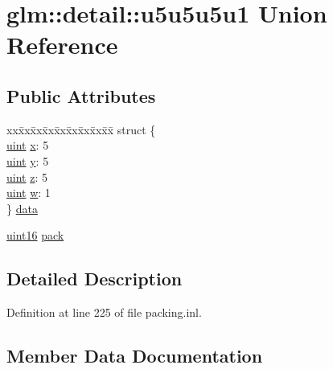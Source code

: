 \hypertarget{unionglm_1_1detail_1_1u5u5u5u1}{}\section{glm\+::detail\+::u5u5u5u1 Union Reference}
\label{unionglm_1_1detail_1_1u5u5u5u1}
\subsection*{Public Attributes}
\begin{DoxyCompactItemize}
\item 
\begin{tabbing}
xx\=xx\=xx\=xx\=xx\=xx\=xx\=xx\=xx\=\kill
struct \{\\
\>\mbox{\hyperlink{group__core__precision_ga4fd29415871152bfb5abd588334147c8}{uint}} \mbox{\hyperlink{unionglm_1_1detail_1_1u5u5u5u1_a2d802a46e48a88f87754882be376b34f}{x}}: 5\\
\>\mbox{\hyperlink{group__core__precision_ga4fd29415871152bfb5abd588334147c8}{uint}} \mbox{\hyperlink{unionglm_1_1detail_1_1u5u5u5u1_a8dff950581d19ad8a5137dbfffc63a64}{y}}: 5\\
\>\mbox{\hyperlink{group__core__precision_ga4fd29415871152bfb5abd588334147c8}{uint}} \mbox{\hyperlink{unionglm_1_1detail_1_1u5u5u5u1_a110d067e1f37f6137c2806102c4508f6}{z}}: 5\\
\>\mbox{\hyperlink{group__core__precision_ga4fd29415871152bfb5abd588334147c8}{uint}} \mbox{\hyperlink{unionglm_1_1detail_1_1u5u5u5u1_a1dc286ba6a4f8b0c04db3997af661cd5}{w}}: 1\\
\} \mbox{\hyperlink{unionglm_1_1detail_1_1u5u5u5u1_a900aa35cb1048e63ac8aebb5ca69d0a5}{data}}\\

\end{tabbing}\item 
\mbox{\hyperlink{namespaceglm_1_1detail_a47b2a7d006d187338e8031a352d1ce56}{uint16}} \mbox{\hyperlink{unionglm_1_1detail_1_1u5u5u5u1_acbc99680c58046aeb5c4f2b284680a8b}{pack}}
\end{DoxyCompactItemize}


\subsection{Detailed Description}


Definition at line 225 of file packing.\+inl.



\subsection{Member Data Documentation}
\mbox{\label{unionglm_1_1detail_1_1u5u5u5u1_a900aa35cb1048e63ac8aebb5ca69d0a5}} 
